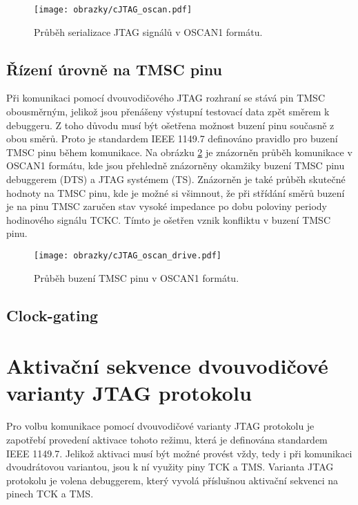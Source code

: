 \begin{figure}[!h]
  \begin{center}
    \texttt{[image: obrazky/cJTAG\_oscan.pdf]}
  \end{center}
  \caption{Průběh serializace \acs{JTAG} signálů v OSCAN1 formátu.}
	\label{fig:oscan}
\end{figure}
    
\subsection{Řízení úrovně na TMSC pinu}	\label{subsec:oscan1_drive} 
Při komunikaci pomocí dvouvodičového \acs{JTAG} rozhraní se stává pin TMSC obousměrným, jelikož jsou přenášeny výstupní testovací data zpět směrem k debuggeru. Z toho důvodu musí být ošetřena možnost buzení pinu současně z obou směrů. Proto je standardem IEEE 1149.7 definováno pravidlo pro buzení TMSC pinu během komunikace. Na obrázku \ref{fig:oscan_drive} je znázorněn průběh komunikace v OSCAN1 formátu, kde jsou přehledně znázorněny okamžiky buzení TMSC pinu debuggerem (\acs{DTS}) a \acs{JTAG} systémem (\acs{TS}). Znázorněn je také průběh skutečné hodnoty na TMSC pinu, kde je možné si všimnout, že při střídání směrů buzení je na pinu TMSC zaručen stav vysoké impedance po dobu poloviny periody hodinového signálu TCKC. Tímto je ošetřen vznik konfliktu v buzení TMSC pinu. \cite{IEEE_1149-7}

\begin{figure}[!h]
  \begin{center}
    \texttt{[image: obrazky/cJTAG\_oscan\_drive.pdf]}
  \end{center}
  \caption{Průběh buzení TMSC pinu v OSCAN1 formátu.}
	\label{fig:oscan_drive}
\end{figure}

\subsection{Clock-gating}	\label{subsec:oscan1_clk_gate}

\section{Aktivační sekvence dvouvodičové varianty JTAG protokolu}
Pro volbu komunikace pomocí dvouvodičové varianty \acs{JTAG} protokolu je zapotřebí provedení aktivace tohoto režimu, která je definována standardem IEEE 1149.7. Jelikož aktivaci musí být možné provést vždy, tedy i při komunikaci dvoudrátovou variantou, jsou k ní využity piny \acs{TCK} a \acs{TMS}. Varianta \acs{JTAG} protokolu je volena debuggerem, který vyvolá příslušnou aktivační sekvenci na pinech \acs{TCK} a \acs{TMS}. \cite{IEEE_1149-7}

